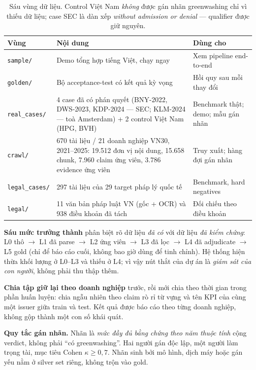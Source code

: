 \documentclass[11pt,a4paper]{article}
\newcommand{\code}[1]{\texttt{#1}}
\begin{document}
\begin{table}[!htbp]\small
\begin{tabularx}{\linewidth}{L{2.4cm} X L{3.6cm}}
\toprule
\textbf{Vùng} & \textbf{Nội dung} & \textbf{Dùng cho} \\
\midrule
\code{sample/} & Demo tổng hợp tiếng Việt, chạy ngay & Xem pipeline end-to-end \\
\code{golden/} & Bộ acceptance-test có kết quả kỳ vọng & Hồi quy sau mỗi thay đổi \\
\code{real\_cases/} & 4 case đã có phán quyết (BNY-2022, DWS-2023, KDP-2024 — SEC; KLM-2024 — toà Amsterdam) + 2 control Việt Nam (HPG, BVH) & Benchmark thật; demo; mẫu gán nhãn \\
\code{crawl/} & 670 tài liệu / 21 doanh nghiệp VN30, 2021--2025: 19.512 đơn vị nội dung, 15.658 chunk, 7.960 claim ứng viên, 3.786 evidence ứng viên & Truy xuất; hàng đợi gán nhãn \\
\code{legal\_cases/} & 297 tài liệu của 29 target pháp lý quốc tế & Benchmark, hard negatives \\
\code{legal/} & 11 văn bản pháp luật VN (gốc + OCR) và 938 điều khoản đã tách & Đối chiếu theo điều khoản \\
\bottomrule
\end{tabularx}
\caption{Sáu vùng dữ liệu. Control Việt Nam \emph{không} được gán nhãn greenwashing chỉ vì thiếu dữ liệu; case SEC là dàn xếp \emph{without admission or denial} — qualifier được giữ nguyên.}
\end{table}

\textbf{Sáu mức trưởng thành} phân biệt rõ dữ liệu \emph{đã có} với dữ liệu \emph{đã kiểm chứng}: L0 thô $\to$ L1 đã parse $\to$ L2 ứng viên $\to$ L3 đã lọc $\to$ L4 đã adjudicate $\to$ L5 gold (chỉ để báo cáo cuối, không bao giờ dùng để tinh chỉnh). Hệ thống hiện thừa khối lượng ở L0--L3 và thiếu ở L4; vì vậy nút thắt của dự án là \emph{giám sát của con người}, không phải thu thập thêm.

\textbf{Chia tập giữ lại theo doanh nghiệp} trước, rồi mới chia theo thời gian trong phần huấn luyện: chia ngẫu nhiên theo claim rò rỉ từ vựng và tên KPI của cùng một issuer giữa train và test. Kết quả được báo cáo theo từng doanh nghiệp, không gộp thành một con số khái quát.

\textbf{Quy tắc gán nhãn.} Nhãn là \emph{mức đầy đủ bằng chứng theo năm thuộc tính} cộng verdict, không phải ``có greenwashing''. Hai người gán độc lập, một người làm trọng tài, mục tiêu Cohen $\kappa \ge 0{,}7$. Nhãn sinh bởi mô hình, dịch máy hoặc gán yếu nằm ở silver set riêng, không trộn vào gold.
\end{document}
